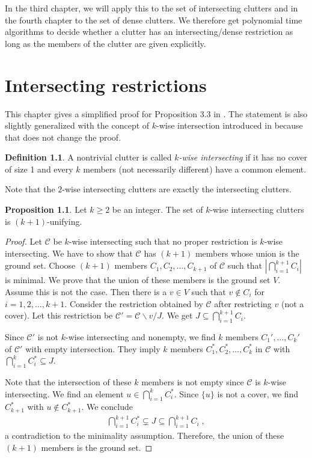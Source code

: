 \documentclass[a4paper, 12pt]{scrbook}
\theoremstyle{definition}
\newtheorem*{definition}{Definition}
\newtheorem{proposition}[theorem]{Proposition}
\begin{document}
   In the third chapter, we will apply this to the set of intersecting clutters and in the fourth chapter to the set of dense clutters.
   We therefore get polynomial time algorithms to decide whether a clutter has an intersecting/dense restriction as long as the members of the clutter are given explicitly.

   \chapter{Intersecting restrictions}
   This chapter gives a simplified proof for Proposition 3.3 in \cite{restrictions}.
   The statement is also slightly generalized with the concept of $k$-wise intersection introduced in \cite{k-wise} because that does not change the proof.
   \begin{definition}
       A nontrivial clutter is called \emph{$k$-wise intersecting} if it has no cover of size 1 and every $k$ members (not necessarily different) have a common element.
   \end{definition}

   Note that the $2$-wise intersecting clutters are exactly the intersecting clutters.
   \begin{proposition}
       Let $k\geq 2$ be an integer.
       The set of $k$-wise intersecting clutters is $(k+1)$-unifying.
   \end{proposition}

   \begin{proof}
       Let $\mathcal{C}$ be $k$-wise intersecting such that no proper restriction is $k$-wise intersecting.
       We have to show that $\mathcal{C}$ has $(k+1)$ members whose union is the ground set.
       Choose $(k+1)$ members $C_1, C_2, \ldots, C_{k+1}$ of $\mathcal{C}$ such that $|\bigcap_{i=1}^{k+1} C_i|$ is minimal.
       We prove that the union of these members is the ground set $V$.
       Assume this is not the case.
       Then there is a $v \in V$ such that $v \not\in C_i$ for $i=1,2, \ldots, k+1$.
       Consider the restriction obtained by $\mathcal{C}$ after restricting $v$ (not a cover).
       Let this restriction be $\mathcal{C'}=\mathcal{C} \backslash v / J$.
       We get $J \subseteq \bigcap_{i=1}^{k+1} C_i$.

       Since $\mathcal{C'}$ is not $k$-wise intersecting and nonempty, we find $k$ members $C_1',\ldots, C_k'$ of $\mathcal{C'}$ with empty intersection.
       They imply $k$ members $C_1^*, C_2^*,\ldots, C_k^*$ in $\mathcal{C}$ with $\bigcap_{i=1}^k C_i^* \subseteq J$.

       Note that the intersection of these $k$ members is not empty since $\mathcal{C}$ is $k$-wise intersecting.
       We find an element $u \in \bigcap_{i=1}^k C_i^*$. Since $\{u\}$ is not a cover, we find $C_{k+1}^*$ with $u \not\in C_{k+1}^*$.
       We conclude
       \begin{align*}
           \bigcap_{i=1}^{k+1} C_i^* \subsetneq J \subseteq \bigcap_{i=1}^{k+1} C_i \;,
       \end{align*}
       a contradiction to the minimality assumption.
       Therefore, the union of these $(k+1)$ members is the ground set.


   \end{proof}
\end{document}
